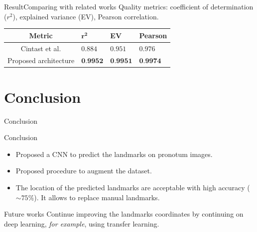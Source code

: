 \documentclass[10pt]{beamer}
\begin{document}
\begin{frame}{Result}{Comparing with related works}
\small{Quality metrics: coefficient of determination ($r^2$), explained variance (EV), Pearson correlation.
	}
	\begin{table}[htbp]
\centering
\begin{center}
\begin{tabular}{|c|p{1cm}|p{1cm}|p{1.5cm}|}
\hline
Metric & $\mathbf{r^{2}}$ & \textbf{EV} & \textbf{Pearson} \\ \hline
Cintast et al.\footnotemark & $0.884$ & $0.951$ & $0.976$ \\ \hline
Proposed architecture & $\textbf{0.9952}$ & $\textbf{0.9951}$ & $\textbf{0.9974}$ \\ \hline
\end{tabular}
\label{tab3}
\end{center}
\end{table}
\end{frame}
\section{Conclusion}
\begin{frame}{Conclusion}
	\begin{block}{Conclusion}
		\small{
			\begin{itemize}
				\item Proposed a CNN to predict the landmarks on pronotum images.
				\item Proposed procedure to augment the dataset.
				\item The location of the predicted landmarks are acceptable with high accuracy ($ \sim75\%$). It allows to replace manual landmarks.
			\end{itemize}
		}
	\end{block}
	\pause
	\begin{block}{Future works}
		\small{Continue improving the landmarks coordinates by continuing on deep learning, \textit{for example}, using transfer learning.}
	\end{block}
\end{frame}

{\1
\begin{frame}
\end{frame}}
\end{document}
